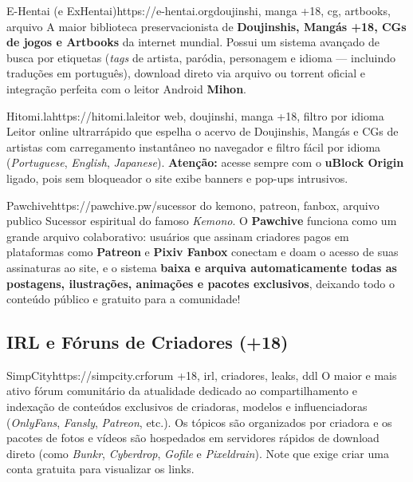 \documentclass{pousadaguide}
\begin{document}
\begin{ferramenta}[goat,logo=e-hentai]{E-Hentai (e ExHentai)}{https://e-hentai.org}{doujinshi, manga +18, cg, artbooks, arquivo}
A maior biblioteca preservacionista de \textbf{Doujinshis, Mangás +18, CGs de jogos e Artbooks} da internet mundial. Possui um sistema avançado de busca por etiquetas (\emph{tags} de artista, paródia, personagem e idioma — incluindo traduções em português), download direto via arquivo ou torrent oficial e integração perfeita com o leitor Android \textbf{Mihon}. 
\end{ferramenta}

\begin{ferramenta}[recomendado,logo=hitomi]{Hitomi.la}{https://hitomi.la}{leitor web, doujinshi, manga +18, filtro por idioma}
Leitor online ultrarrápido que espelha o acervo de Doujinshis, Mangás e CGs de artistas com carregamento instantâneo no navegador e filtro fácil por idioma (\emph{Portuguese}, \emph{English}, \emph{Japanese}). \textbf{Atenção:} acesse sempre com o \textbf{uBlock Origin} ligado, pois sem bloqueador o site exibe banners e pop-ups intrusivos. 
\end{ferramenta}

\begin{ferramenta}[recomendado,logo=pawchive]{Pawchive}{https://pawchive.pw/}{sucessor do kemono, patreon, fanbox, arquivo publico}
Sucessor espiritual do famoso \emph{Kemono}. O \textbf{Pawchive} funciona como um grande arquivo colaborativo: usuários que assinam criadores pagos em plataformas como \textbf{Patreon} e \textbf{Pixiv Fanbox} conectam e doam o acesso de suas assinaturas ao site, e o sistema \textbf{baixa e arquiva automaticamente todas as postagens, ilustrações, animações e pacotes exclusivos}, deixando todo o conteúdo público e gratuito para a comunidade! 
\end{ferramenta}

\subsection{IRL e Fóruns de Criadores (+18)}

\begin{ferramenta}[goat,logo=simpcity]{SimpCity}{https://simpcity.cr}{forum +18, irl, criadores, leaks, ddl}
O maior e mais ativo fórum comunitário da atualidade dedicado ao compartilhamento e indexação de conteúdos exclusivos de criadoras, modelos e influenciadoras (\emph{OnlyFans}, \emph{Fansly}, \emph{Patreon}, etc.). Os tópicos são organizados por criadora e os pacotes de fotos e vídeos são hospedados em servidores rápidos de download direto (como \emph{Bunkr}, \emph{Cyberdrop}, \emph{Gofile} e \emph{Pixeldrain}). Note que exige criar uma conta gratuita para visualizar os links. 
\end{ferramenta}
\end{document}
